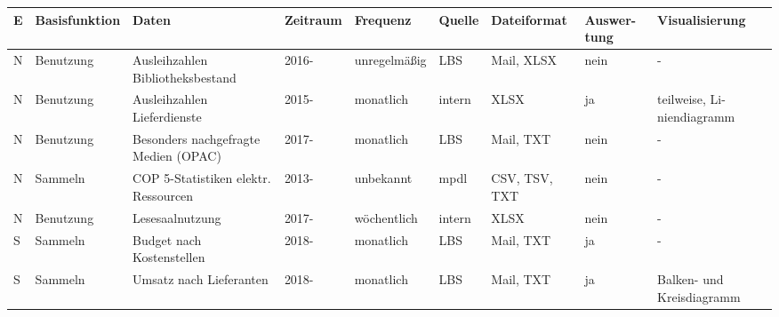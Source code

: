 \begin{table}[H]
    \centering
    \large
    \begin{adjustbox}{max width=\textwidth}
    \begin{tabular}{p{}p{}p{}p{}p{}p{}p{}p{}p{}}
       \toprule
       \textbf{E} &\textbf{Basisfunktion}               &\textbf{Daten}                                 &\textbf{Zeitraum} &\textbf{Frequenz}    &\textbf{Quelle}  &\textbf{Dateiformat}          &\textbf{Auswer-tung} & \textbf{Visualisierung}\\
       \midrule     
            N         &Benutzung                      & Ausleihzahlen Bibliotheksbestand              & 2016-             & unregelmäßig         & LBS          & Mail, XLSX              & nein  & -\\
            N         &Benutzung                      & Ausleihzahlen Lieferdienste                   & 2015-             & monatlich         & intern       & XLSX                      & ja    & teilweise, Li-niendiagramm\\ 
            N         &Benutzung                      & Besonders nachgefragte Medien (OPAC)          & 2017-             & monatlich         & LBS          & Mail, TXT                 & nein  & -\\ 
            N         &Sammeln                       &\acrshort{COP 5}-Statistiken elektr. Ressourcen& 2013-            & unbekannt                 & mpdl         & CSV, TSV, TXT             & nein  & -\\ 
            N         &Benutzung                      & Lesesaalnutzung                               & 2017-             & wöchentlich       & intern       & XLSX                      & nein  & -\\ 
            S         &Sammeln                       & Budget nach Kostenstellen                   & 2018-               & monatlich         & LBS          & Mail, TXT                 & ja    & -\\ 
            S         &Sammeln                       & Umsatz nach Lieferanten                     & 2018-               & monatlich         & LBS          & Mail, TXT                 & ja    & Balken- und Kreisdiagramm\\ 

\end{tabular}
\end{adjustbox}
\end{table}
